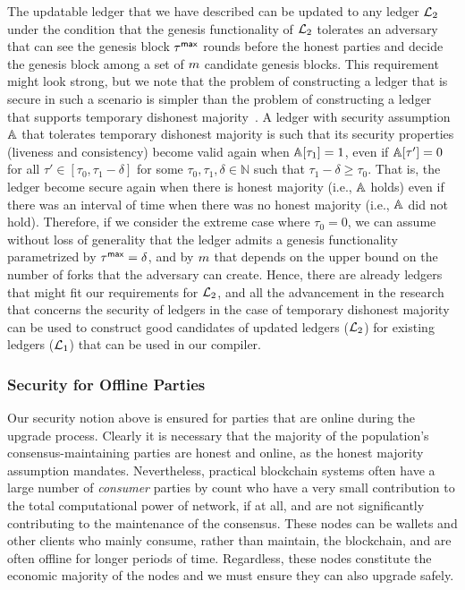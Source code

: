The updatable ledger that we have described can be updated to any ledger $\mathcal{L}_2$ under the condition 
that the genesis functionality of $\mathcal{L}_2$ tolerates an adversary that can see the genesis block
$\tau^\mathsf{max}$ rounds before the honest parties and decide the genesis block among a set of $m$ candidate 
genesis blocks. This requirement might look strong, but we note that the problem of constructing a ledger 
that is secure in such a scenario is simpler than the problem of constructing a ledger that supports temporary dishonest majority~\cite{FC:AKWW19}. A ledger with security assumption $\mathbb{A}$ that tolerates temporary dishonest majority is such that its security properties (liveness and consistency) become valid again 
when $\mathbb{A}[\tau_1]=1$, even if $\mathbb{A}[\tau']=0$ for all $\tau'\in[\tau_0, \tau_1-\delta]$
for some $\tau_0,\tau_1,\delta \in\mathbb{N}$ such that  $\tau_1-\delta\geq \tau_0$. That is,
the ledger become secure again when there is honest majority (i.e., $\mathbb{A}$ holds) even if there was an interval of time when there was no honest majority (i.e., $\mathbb{A}$ did not hold).
Therefore, if we consider the extreme case where $\tau_0=0$, we can assume without loss of generality 
that the ledger admits a genesis functionality parametrized by $\tau^\mathsf{max}=\delta$, and by $m$
that depends on the upper bound on the number of forks that the adversary can create. 
Hence, there are already ledgers that might fit our requirements for $\mathcal{L}_2$, and all the advancement in the 
research that concerns the security of ledgers in the case of temporary dishonest majority can be used 
to construct good candidates of updated ledgers ($\mathcal{L}_2$) for existing ledgers ($\mathcal{L}_1$) that can be used in our compiler.

\subsubsection{Security for Offline Parties}
\newcommand{\concat}{\,\|\,}

Our security notion above is ensured for parties that are online during the upgrade process. Clearly it
is necessary that the majority of the population's consensus-maintaining parties are honest and
online, as the honest majority assumption mandates. Nevertheless, practical blockchain systems often have
a large number of \emph{consumer} parties by count who have a very small contribution to the total computational power of
network, if at all, and are not significantly contributing to the maintenance of the consensus.
These nodes can be wallets and other clients who mainly consume, rather than maintain, the blockchain,
and are often offline for longer periods of time.
Regardless, these nodes constitute the economic majority of the nodes and we must ensure
they can also upgrade safely.

